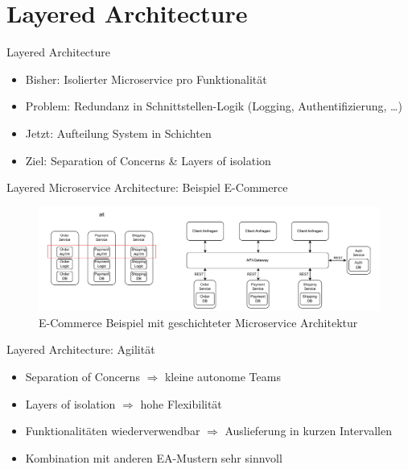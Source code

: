 \section{Layered Architecture}

\begin{frame}{Layered Architecture}
    \begin{itemize}
        \item Bisher: Isolierter Microservice pro Funktionalität
        \item Problem: Redundanz in Schnittstellen-Logik (Logging, Authentifizierung, \ldots)
        \item Jetzt: Aufteilung System in Schichten
        \item Ziel: Separation of Concerns \& Layers of isolation
    \end{itemize}
\end{frame}

\begin{frame}{Layered Microservice Architecture: Beispiel E-Commerce}
    \begin{figure}[!h]
        \centering
        \includegraphics[scale=0.55]{imglib/layered/ecommerce-example}
        \caption{E-Commerce Beispiel mit geschichteter Microservice Architektur}
        \label{fig:layered}
    \end{figure}
\end{frame}

\begin{frame}{Layered Architecture: Agilität}
    \begin{itemize}
        \item Separation of Concerns $\Rightarrow$ kleine autonome Teams
        \item Layers of isolation $\Rightarrow$ hohe Flexibilität
        \item Funktionalitäten wiederverwendbar $\Rightarrow$ Auslieferung in kurzen Intervallen
        \item Kombination mit anderen EA-Mustern sehr sinnvoll
    \end{itemize}
\end{frame}

